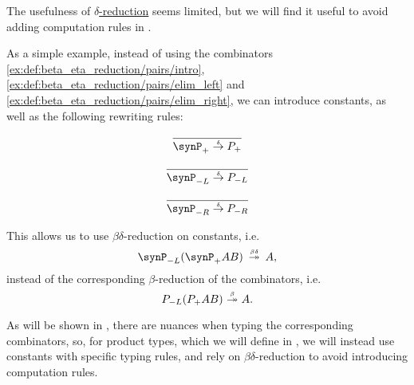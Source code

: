 \begin{remark}\label{rem:delta_reduction}
  The usefulness of \hyperref[def:delta_reduction]{\( \delta \)-reduction} seems limited, but we will find it useful to avoid adding computation rules in .

  As a simple example, instead of using the combinators \ref{ex:def:beta_eta_reduction/pairs/intro}, \ref{ex:def:beta_eta_reduction/pairs/elim_left} and \ref{ex:def:beta_eta_reduction/pairs/elim_right}, we can introduce constants, as well as the following rewriting rules:
  \begin{paracol}{3}
    \begin{nthcolumn}{0}
      \ParacolAlignmentHack
      \begin{equation*}
        \begin{prooftree}
          \infer0{ \synP_+ \dred P_+ }
        \end{prooftree}
      \end{equation*}
    \end{nthcolumn}

    \begin{nthcolumn}{1}
      \ParacolAlignmentHack
      \begin{equation*}
        \begin{prooftree}
          \infer0{ \synP_{-L} \dred P_{-L} }
        \end{prooftree}
      \end{equation*}
    \end{nthcolumn}

    \begin{nthcolumn}{2}
      \ParacolAlignmentHack
      \begin{equation*}
        \begin{prooftree}
          \infer0{ \synP_{-R} \dred P_{-R} }
        \end{prooftree}
      \end{equation*}
    \end{nthcolumn}
  \end{paracol}

  This allows us to use \( \beta\delta \)-reduction on constants, i.e.
  \begin{equation*}
    \synP_{-L} (\synP_+ A B) \redrel*{\beta\delta} A,
  \end{equation*}
  instead of the corresponding \( \beta \)-reduction of the combinators, i.e.
  \begin{equation*}
    P_{-L} (P_+ A B) \bred* A.
  \end{equation*}

  As will be shown in , there are nuances when typing the corresponding combinators, so, for product types, which we will define in , we will instead use constants with specific typing rules, and rely on \( \beta\delta \)-reduction to avoid introducing computation rules.
\end{remark}

